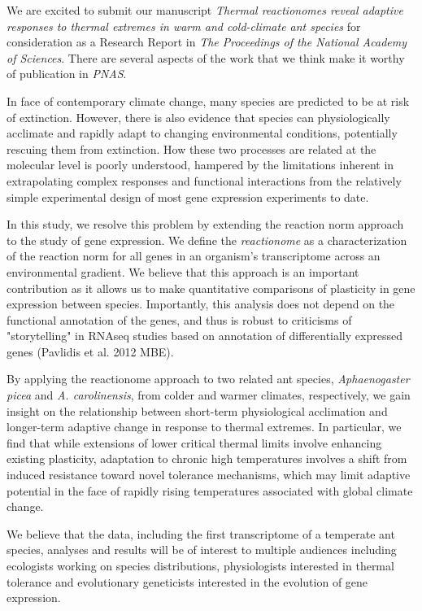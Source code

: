 \documentclass[letterpaper]{article}
\begin{document}
\thispagestyle{first}


We are excited to submit our manuscript \emph{Thermal
reactionomes reveal adaptive responses to thermal extremes in warm and
cold-climate ant species} for consideration as a Research Report in
\emph{The Proceedings of the National Academy of Sciences}. There are
several aspects of the work that we think make it worthy of publication
in \emph{PNAS}.

In face of contemporary climate change, many species are predicted to be at 
risk of extinction. However, there is also evidence that species can physiologically
acclimate and rapidly adapt to changing environmental conditions, potentially
rescuing them from extinction. How these two processes are related at the molecular
level is poorly understood, hampered by the limitations inherent in extrapolating 
complex responses and functional interactions from the relatively simple experimental
design of most gene expression experiments to date. 

In this study, we resolve this problem by extending the reaction
norm approach to the study of gene expression. We define the
\emph{reactionome} as a characterization of the reaction norm for all
genes in an organism's transcriptome across an environmental gradient. 
We believe that this approach is an important contribution as it allows us
to make quantitative comparisons of plasticity in gene expression between
species. Importantly, this analysis does not depend on the functional 
annotation of the genes, and thus is robust to criticisms of "storytelling" 
in RNAseq studies based on annotation of differentially expressed 
genes (Pavlidis et al. 2012 MBE). 

By applying the reactionome approach to two related ant species,
\emph{Aphaenogaster picea} and \emph{A. carolinensis}, from colder and
warmer climates, respectively, we gain insight on the relationship
between short-term physiological acclimation and longer-term adaptive
change in response to thermal extremes. In particular, we find that while
extensions of lower critical thermal limits involve enhancing existing plasticity,
adaptation to chronic high temperatures involves a shift from induced resistance
toward novel tolerance mechanisms, which may limit adaptive potential 
in the face of rapidly rising temperatures associated with global climate change.

We believe that the data, including the first transcriptome of a
temperate ant species, analyses and results will be of interest to
multiple audiences including ecologists working on species
distributions, physiologists interested in thermal tolerance and
evolutionary geneticists interested in the evolution of gene expression.
\end{document}
